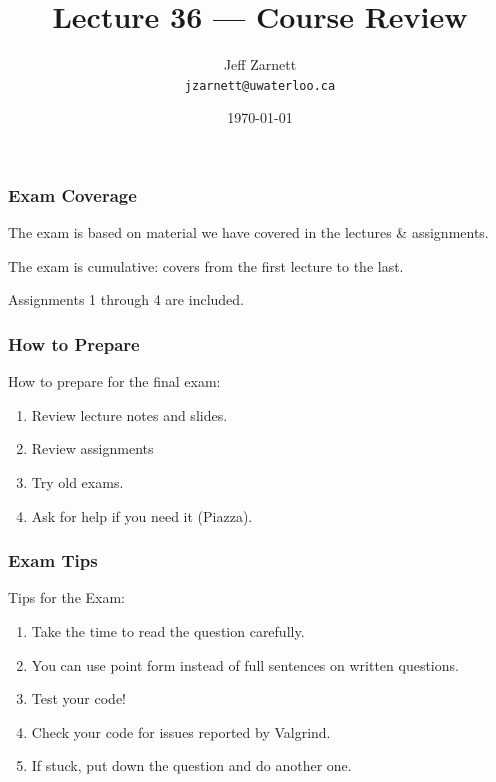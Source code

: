 

\title{Lecture 36 --- Course Review }

\author{Jeff Zarnett \\ \small \texttt{jzarnett@uwaterloo.ca}}
\date{\today}




\begin{frame}
  \titlepage

\end{frame}

\begin{frame}
\frametitle{Exam Coverage}

The exam is based on material we have covered in the lectures \& assignments.

The exam is cumulative: covers from the first lecture to the last.

Assignments 1 through 4 are included.

\end{frame}

\begin{frame}
\frametitle{How to Prepare}

How to prepare for the final exam:

\begin{enumerate}
	\item Review lecture notes and slides.
	\item Review assignments
	\item Try old exams.
	\item Ask for help if you need it (Piazza).
\end{enumerate}

\end{frame}

\begin{frame}
\frametitle{Exam Tips}

Tips for the Exam:

\begin{enumerate}
	\item Take the time to read the question carefully.
	\item You can use point form instead of full sentences on written questions.
	\item Test your code!
	\item Check your code for issues reported by Valgrind.
	\item If stuck, put down the question and do another one.
\end{enumerate}

\end{frame}


